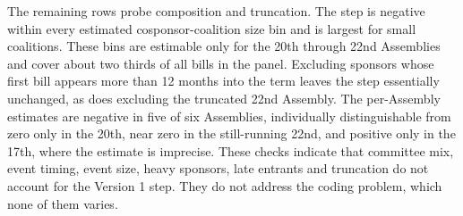 \documentclass[11pt]{article}
\begin{document}
The remaining rows probe composition and truncation. The step is negative within every estimated cosponsor-coalition size bin and is largest for small coalitions. These bins are estimable only for the 20th through 22nd Assemblies and cover about two thirds of all bills in the panel. Excluding sponsors whose first bill appears more than 12 months into the term leaves the step essentially unchanged, as does excluding the truncated 22nd Assembly. The per-Assembly estimates are negative in five of six Assemblies, individually distinguishable from zero only in the 20th, near zero in the still-running 22nd, and positive only in the 17th, where the estimate is imprecise. These checks indicate that committee mix, event timing, event size, heavy sponsors, late entrants and truncation do not account for the Version 1 step. They do not address the coding problem, which none of them varies.
\end{document}
